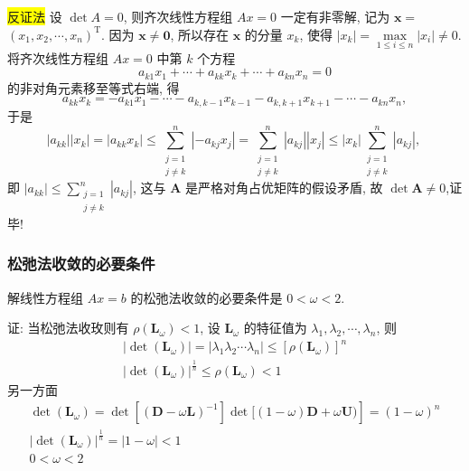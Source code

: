  \colorbox{yellow}{反证法} 设 $ \operatorname{det} A=0 $, 则齐次线性方程组 $ A x=0 $ 一定有非零解, 记为 $ \boldsymbol{x}= $ $ \left(x_{1}, x_{2}, \cdots, x_{n}\right)^{\mathrm{T}} $. 因为 $ \boldsymbol{x} \neq \mathbf{0} $, 所以存在 $ \boldsymbol{x} $ 的分量 $ x_{k} $, 使得 $ \left|x_{k}\right|=\max\limits _{1 \leqslant i \leqslant n}\left|x_{i}\right| \neq 0 $.
将齐次线性方程组 $ A x=0 $ 中第 $ k $ 个方程
$$
a_{k 1} x_{1}+\cdots+a_{k k} x_{k}+\cdots+a_{k n} x_{n}=0
$$
的非对角元素移至等式右端, 得
$$
a_{k k} x_{k}=-a_{k 1} x_{1}-\cdots-a_{k, k-1} x_{k-1}-a_{k, k+1} x_{k+1}-\cdots-a_{k n} x_{n},
$$
于是
$$
\left|a_{k k}\right|\left|x_{k}\right|=\left|a_{k k} x_{k}\right| \leqslant \sum_{\substack{j=1 \\ j \neq k}}^{n}\left|-a_{k j} x_{j}\right|=\sum_{\substack{j=1 \\ j \neq k}}^{n}\left|a_{k j}\right|\left|x_{j}\right| \leqslant\left|x_{k}\right| \sum_{\substack{j=1 \\ j \neq k}}^{n}\left|a_{k j}\right| \text {, }
$$
即 $ \left|a_{k k}\right| \leqslant \sum_{\substack{j=1 \\ j \neq k}}^{n}\left|a_{k j}\right| $, 这与 $ \boldsymbol{A} $ 是严格对角占优矩阵的假设矛盾, 故 $ \operatorname{det} \boldsymbol{A} \neq 0 $,证毕!



\subsubsection{松弛法收敛的必要条件}
解线性方程组 $ A x=b $ 的松弛法收敛的必要条件是 $ 0<\omega<2 $.

证: 当松弛法收玫则有 $ \rho\left(\boldsymbol{L}_{\omega}\right)<1 $, 设 $ \boldsymbol{L}_{\omega} $ 的特征值为 $ \lambda_{1}, \lambda_{2}, \cdots, \lambda_{n} $, 则
$$
\begin{array}{c}
\left|\operatorname{det}\left(\boldsymbol{L}_{\omega}\right)\right|=\left|\lambda_{1} \lambda_{2} \cdots \lambda_{n}\right| \leqslant\left[\rho\left(\boldsymbol{L}_{\omega}\right)\right]^{n} \\
\left|\operatorname{det}\left(\boldsymbol{L}_{\omega}\right)\right|^{\frac{1}{n}} \leqslant \rho\left(\boldsymbol{L}_{\omega}\right)<1
\end{array}
$$
另一方面
$$
\begin{array}{c}
\left.\operatorname{det}\left(\boldsymbol{L}_{\omega}\right)=\operatorname{det}\left[(\boldsymbol{D}-\omega \boldsymbol{L})^{-1}\right] \operatorname{det}[(1-\omega) \boldsymbol{D}+\omega \boldsymbol{U})\right]=(1-\omega)^{n} \\
\left|\operatorname{det}\left(\boldsymbol{L}_{\omega}\right)\right|^{\frac{1}{n}}=|1-\omega|<1 \\
0<\omega<2
\end{array}
$$




